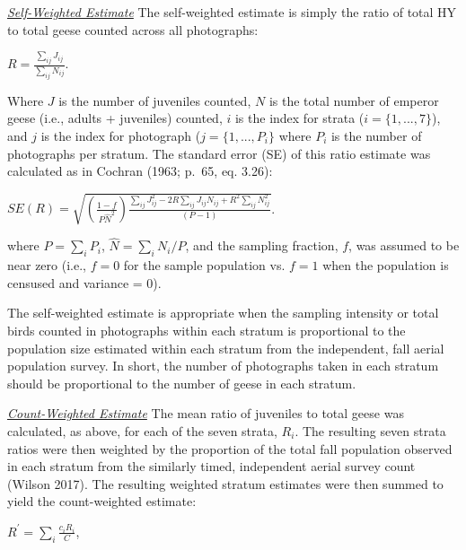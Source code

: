 \documentclass[]{article}
\begin{document}
\setlength{\parskip}{1ex} \setlength{\parindent}{4em}
\underline{\textit{Self-Weighted Estimate}} \setlength{\parindent}{0in}
The self-weighted estimate is simply the ratio of total HY to total
geese counted across all photographs:\\

\begin{center}
$R = \frac{ \sum_{ij} J_{ij} }{ \sum_{ij} N_{ij} }$.
\end{center}

\medskip
Where \(J\) is the number of juveniles counted, \(N\) is the total
number of emperor geese (i.e., adults + juveniles) counted, \(i\) is the
index for strata (\(i = \{1, ..., 7\}\)), and \(j\) is the index for
photograph (\(j = \{1, ..., P_i\}\) where \(P_i\) is the number of
photographs per stratum. The standard error (SE) of this ratio
estimate was calculated as in Cochran (1963; p.~65, eq. 3.26): \medskip

\begin{center}
$SE(R) = \sqrt { (\frac{1 - f}{P\hat{N}^2}) \frac{\sum_{ij} J_{ij}^2 - 2R \sum_{ij} J_{ij} N_{ij} + R^2 \sum_{ij}N_{ij}^2}{(P - 1)} }$.
\end{center}

\medskip
where \(P = \sum_i P_i\), \(\hat{N}=\sum_i{N_i}/P\), and the sampling
fraction, \(f\), was assumed to be near zero (i.e., \(f = 0\) for the
sample population vs. \(f = 1\) when the population is censused and
variance = 0).

The self-weighted estimate is appropriate when the sampling intensity or
total birds counted in photographs within each stratum is proportional
to the population size estimated within each stratum from the
independent, fall aerial population survey. In short, the number of
photographs taken in each stratum should be proportional to the number
of geese in each stratum.

\setlength{\parskip}{1ex} \setlength{\parindent}{4em}
\underline{\textit{Count-Weighted Estimate}} \setlength{\parindent}{0in}
The mean ratio of juveniles to total geese was calculated, as above, for
each of the seven strata, \(R_i\). The resulting seven strata ratios
were then weighted by the proportion of the total fall population
observed in each stratum from the similarly timed, independent aerial
survey count (Wilson 2017). The resulting weighted stratum estimates
were then summed to yield the count-weighted estimate: \medskip

\begin{center}
$R^\prime = \sum_i \frac{c_iR_i}{C}$, 
\end{center}
\end{document}
